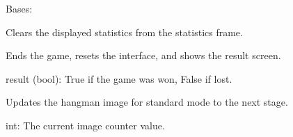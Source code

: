 \documentclass[letterpaper,10pt,english]{sphinxmanual}
\begin{document}
\begin{fulllineitems}
\label{\detokenize{modules:GUI.HangmanGUI}}
\pysigstartsignatures
{}
\pysigstopsignatures
\sphinxAtStartPar
Bases: 

\begin{fulllineitems}
\label{\detokenize{modules:GUI.HangmanGUI.clear_statistics}}
\pysigstartsignatures
{}
\pysigstopsignatures
\sphinxAtStartPar
Clears the displayed statistics from the statistics frame.

\end{fulllineitems}


\begin{fulllineitems}
\label{\detokenize{modules:GUI.HangmanGUI.end}}
\pysigstartsignatures
{}
\pysigstopsignatures
\sphinxAtStartPar
Ends the game, resets the interface, and shows the result screen.
\begin{description}
\sphinxAtStartPar
result (bool): True if the game was won, False if lost.

\end{description}

\end{fulllineitems}


\begin{fulllineitems}
\label{\detokenize{modules:GUI.HangmanGUI.next_image}}
\pysigstartsignatures
{}
\pysigstopsignatures
\sphinxAtStartPar
Updates the hangman image for standard mode to the next stage.
\begin{description}
\sphinxAtStartPar
int: The current image counter value.

\end{description}


\end{fulllineitems}
\end{fulllineitems}
\end{document}
